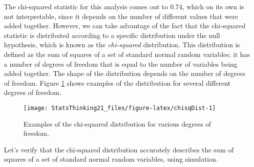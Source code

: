 \documentclass[]{book}
\newenvironment{Shaded}{\begin{snugshade}}{\end{snugshade}}
\newcommand{\KeywordTok}[1]{\textcolor[rgb]{0.13,0.29,0.53}{\textbf{#1}}}
\newcommand{\DecValTok}[1]{\textcolor[rgb]{0.00,0.00,0.81}{#1}}
\newcommand{\StringTok}[1]{\textcolor[rgb]{0.31,0.60,0.02}{#1}}
\newcommand{\CommentTok}[1]{\textcolor[rgb]{0.56,0.35,0.01}{\textit{#1}}}
\newcommand{\OperatorTok}[1]{\textcolor[rgb]{0.81,0.36,0.00}{\textbf{#1}}}
\newcommand{\NormalTok}[1]{#1}
\theoremstyle{definition}
\theoremstyle{definition}
\theoremstyle{definition}
\theoremstyle{remark}
\begin{document}
\begin{Shaded}
\end{Shaded}

The chi-squared statistic for this analysis comes out to 0.74, which on
its own is not interpretable, since it depends on the number of
different values that were added together. However, we can take
advantage of the fact that the chi-squared statistic is distributed
according to a specific distribution under the null hypothesis, which is
known as the \emph{chi-squared} distribution. This distribution is
defined as the sum of squares of a set of standard normal random
variables; it has a number of degrees of freedom that is equal to the
number of variables being added together. The shape of the distribution
depends on the number of degrees of freedom. Figure \ref{fig:chisqDist}
shows examples of the distribution for several different degrees of
freedom.

\begin{figure}
\texttt{[image: StatsThinking21\_files/figure-latex/chisqDist-1]} \caption{Examples of the chi-squared distribution for various degrees of freedom.}\label{fig:chisqDist}
\end{figure}

Let's verify that the chi-squared distribution accurately describes the
sum of squares of a set of standard normal random variables, using
simulation.
\end{document}
